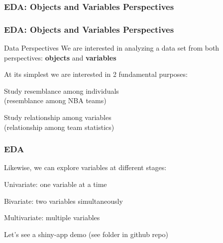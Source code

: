 \documentclass[12pt]{beamer}\usepackage[]{graphicx}\usepackage[]{color}
\begin{document}

\begin{frame}
\frametitle{EDA: Objects and Variables Perspectives}
\begin{center}
\end{center}
\end{frame}


\begin{frame}
\frametitle{EDA: Objects and Variables Perspectives}

\begin{block}{Data Perspectives}
We are interested in analyzing a data set from both perspectives: 
\textbf{objects} and \textbf{variables}
\end{block}

At its simplest we are interested in 2 fundamental purposes:
\bi
  \item Study resemblance among individuals \\
  {\lolit (resemblance among NBA teams)} 
  \item Study relationship among variables \\
  {\lolit (relationship among team statistics)}
\ei

\end{frame}


\begin{frame}
\frametitle{EDA}

Likewise, we can explore variables at different stages:
\bbi
  \item Univariate: one variable at a time
  \item Bivariate: two variables simultaneously
  \item Multivariate: multiple variables
\ei
\eb

Let's see a shiny-app demo (see  folder in github repo)

\end{frame}

\end{document}
